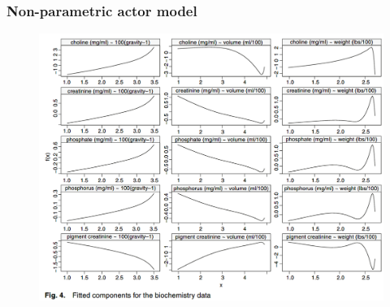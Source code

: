 \documentclass{beamer}
\begin{document}
	
	\begin{frame}
		\frametitle{Non-parametric actor model}
		\begin{figure}
			\includegraphics[width=.8\linewidth]{image013.png}
		\end{figure}
	\end{frame}
	
	
\end{document}
